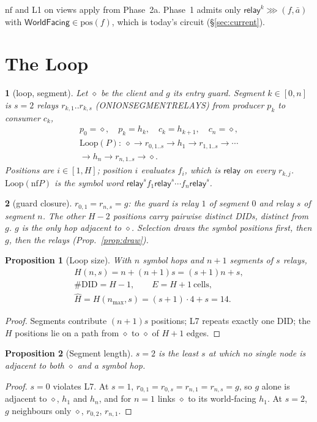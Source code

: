 \documentclass[journal]{IEEEtran}
\newtheorem{proposition}{Proposition}
\newcommand{\namedhead}{}
\newtheorem*{namedenv}{\namedhead}
\newenvironment{defD}[2]{\renewcommand{\namedhead}{Definition #1}%
  \begin{namedenv}[#2]}{\end{namedenv}}
\newenvironment{lawL}[2]{\renewcommand{\namedhead}{Law #1}%
  \begin{namedenv}[#2]}{\end{namedenv}}
\newcommand{\then}{\mathbin{\ggg}}
\newcommand{\relay}{\mathsf{relay}}
\newcommand{\WF}{\mathsf{WorldFacing}}
\newcommand{\cl}{\diamond}
\newcommand{\nf}{\mathrm{nf}}
\newcommand{\LoopOf}{\mathrm{Loop}}
\newcommand{\pos}{\mathrm{pos}}
\newcommand{\Hm}{\hat H}
\DeclareRobustCommand{\code}[1]{{\ttfamily\renewcommand{\_}{\textunderscore\allowbreak}#1}}
\begin{document}
$\nf$ and L1 on views apply from Phase~2a.  Phase~1 admits only
$\relay^{k}\then(f,\bar a)$ with $\WF\in\pos(f)$, which
is today's circuit (\S\ref{sec:current}).

\section{The Loop}\label{sec:loop}

\begin{defD}{D4c, D5}{loop, segment}
Let $\cl$ be the client and $g$ its entry guard.  Segment $k\in[0,n]$
is $s=2$ relays $r_{k,1}..r_{k,s}$ (\code{ONION\_SEGMENT\_RELAYS}) from producer $p_k$ to consumer $c_k$,
\begin{gather*}
p_0=\cl,\quad p_k=h_k,\quad c_k=h_{k+1},\quad c_n=\cl,\\
\LoopOf(P):\ \cl\to r_{0,1..s}\to h_1\to r_{1,1..s}\to\cdots\\
\to h_n\to r_{n,1..s}\to\cl .
\end{gather*}
Positions are $i\in[1,H]$; position $i$ evaluates $f_i$,
which is $\relay$ on every $r_{k,j}$.  $\LoopOf(\nf P)$ is the symbol word
$\relay^{s}f_1\relay^{s}\cdots f_n\relay^{s}$.
\end{defD}

\begin{lawL}{L7}{guard closure}
$r_{0,1}=r_{n,s}=g$: the guard is relay $1$ of segment $0$ and relay $s$
of segment $n$.  The other $H-2$ positions carry pairwise distinct DIDs,
distinct from $g$.  $g$ is the only hop adjacent to $\cl$.  Selection
draws the symbol positions first, then $g$, then the relays
(Prop.~\ref{prop:draw}).
\end{lawL}

\begin{proposition}[Loop size]\label{prop:size}
With $n$ symbol hops and $n+1$ segments of $s$ relays,
\begin{gather*}
H(n,s)=n+(n+1)s=(s+1)n+s,\\
\#\mathrm{DID}=H-1,\qquad E=H+1\ \text{cells},\\
\Hm=H(n_{\max},s)=(s+1)\cdot4+s=14 .
\end{gather*}
\end{proposition}
\begin{proof}
Segments contribute $(n+1)s$ positions; L7 repeats exactly one DID; the
$H$ positions lie on a path from $\cl$ to $\cl$ of $H+1$ edges.
\end{proof}

\begin{proposition}[Segment length]\label{prop:s}
$s=2$ is the least $s$ at which no single node is adjacent to both $\cl$
and a symbol hop.
\end{proposition}
\begin{proof}
$s=0$ violates L7.  At $s=1$, $r_{0,1}=r_{0,s}=r_{n,1}=r_{n,s}=g$, so $g$
alone is adjacent to $\cl$, $h_1$ and $h_n$, and for $n=1$ links $\cl$ to
its world-facing $h_1$.  At $s=2$, $g$ neighbours only $\cl$, $r_{0,2}$,
$r_{n,1}$.
\end{proof}
\end{document}
